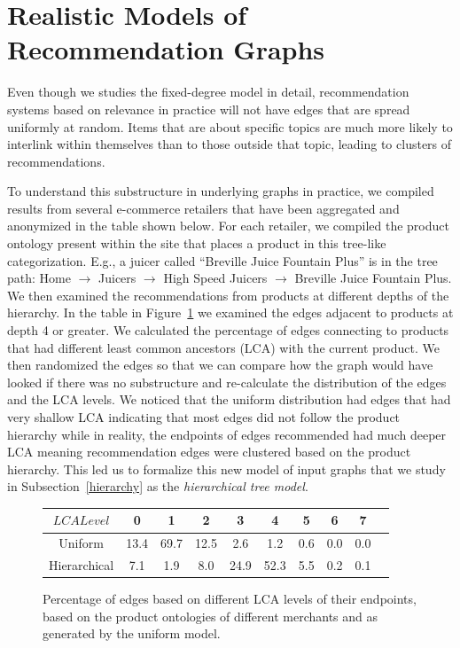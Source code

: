\section{Realistic Models of Recommendation Graphs}
Even though we studies the fixed-degree model in detail, recommendation systems based on relevance in practice
will not have edges that are spread uniformly at random. Items that are
about specific topics are much more likely to interlink within
themselves than to those outside that topic, leading to
clusters of recommendations.

To understand this substructure in underlying
graphs in practice, we compiled results from several e-commerce retailers that
have been aggregated and anonymized in the table shown below. For each
retailer, we compiled the product ontology present within the
site that places a product in this tree-like categorization. E.g., a
juicer called ``Breville Juice Fountain Plus'' is in the tree path:
Home $\rightarrow$ Juicers $\rightarrow$ High Speed Juicers
$\rightarrow$ Breville Juice Fountain Plus. We then examined the
recommendations from products at different depths of the hierarchy. In
the table in Figure~\ref{fig:hier} we examined the edges adjacent to
products at depth 4 or greater. We calculated the percentage of edges
connecting to products that had different least common ancestors (LCA) with the current product.  We
then randomized the edges so that we can compare how the graph would
have looked if there was no substructure and re-calculate the
distribution of the edges and the LCA levels. We noticed that the
uniform distribution had edges that had very shallow LCA indicating that 
most edges did not follow the product hierarchy while in reality,
the endpoints of edges recommended had much deeper LCA meaning recommendation edges were clustered based on the product hierarchy. This led us
to formalize this new model of input graphs that we study in Subsection~\ref{hierarchy}
as the {\em hierarchical tree model}.

\begin{figure}[h]
  \centering
  \begin{tabular}{ |c|c|c|c|c|c|c|c|c|c| }
    \hline
    $LCA Level$ & 0 & 1 & 2 & 3 & 4 & 5 & 6 & 7 \\ \hline
    Uniform & 13.4 & 69.7 & 12.5 & 2.6 & 1.2 & 0.6 & 0.0 & 0.0 \\ \hline
    Hierarchical & 7.1 & 1.9 & 8.0 & 24.9 & 52.3 & 5.5 & 0.2 & 0.1\\
    \hline
  \end{tabular}
  \caption{Percentage of edges based on different LCA levels of their endpoints, based on the product ontologies of different merchants and as generated by the uniform model.}\label{fig:hier}
\end{figure}

